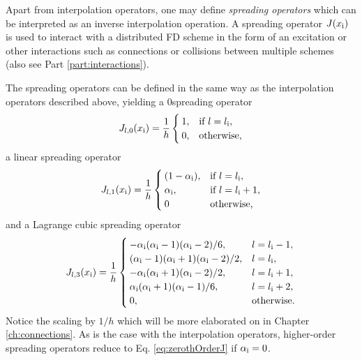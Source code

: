 Apart from interpolation operators, one may define \textit{spreading operators} which can be interpreted as an inverse interpolation operation. A spreading operator $J(x_{\text{i}})$ is used to interact with a distributed FD scheme in the form of an excitation or other interactions such as connections or collisions between multiple schemes (also see Part \ref{part:interactions}).

The spreading operators can be defined in the same way as the interpolation operators described above, yielding a $0$\thOrder spreading operator
\begin{equation}\label{eq:zerothOrderJ}
    J_{l,0}(x_{\text{i}}) = \frac{1}{h}\begin{cases}
        1, & \text{if}\ l = l_{\text{i}},\\
        0, & \text{otherwise},
    \end{cases}
\end{equation}
a linear spreading operator
\begin{equation}\label{eq:firstOrderJ}
    J_{l,1}(x_{\text{i}}) = \frac{1}{h}\begin{cases}
        (1-\alpha_{\text{i}}), & \text{if}\ l = l_{\text{i}},\\
        \alpha_{\text{i}} , & \text{if}\ l = l_{\text{i}} + 1,\\
        0 & \text{otherwise,}
    \end{cases}
\end{equation}
and a Lagrange cubic spreading operator
\begin{equation}\label{eq:cubicJ}
    J_{l,3}(x_{\text{i}}) = \frac{1}{h}\begin{cases}
        -\alpha_{\text{i}} (\alpha_{\text{i}}-1)(\alpha_{\text{i}}-2)/6, & l = l_{\text{i}}-1,\\
        (\alpha_{\text{i}}-1)(\alpha_{\text{i}}+1)(\alpha_{\text{i}}-2)/2,  & l = l_{\text{i}},\\
        -\alpha_{\text{i}} (\alpha_{\text{i}}+1)(\alpha_{\text{i}}-2)/2, & l = l_{\text{i}} + 1,\\
        \alpha_{\text{i}} (\alpha_{\text{i}}+1)(\alpha_{\text{i}}-1)/6, & l = l_{\text{i}} + 2,\\
        0, & \text{otherwise.}
    \end{cases}
\end{equation}
Notice the scaling by $1/h$ which will be more elaborated on in Chapter \ref{ch:connections}. As is the case with the interpolation operators, higher-order spreading operators reduce to Eq. \eqref{eq:zerothOrderJ} if $\alpha_{\text{i}} = 0$.

